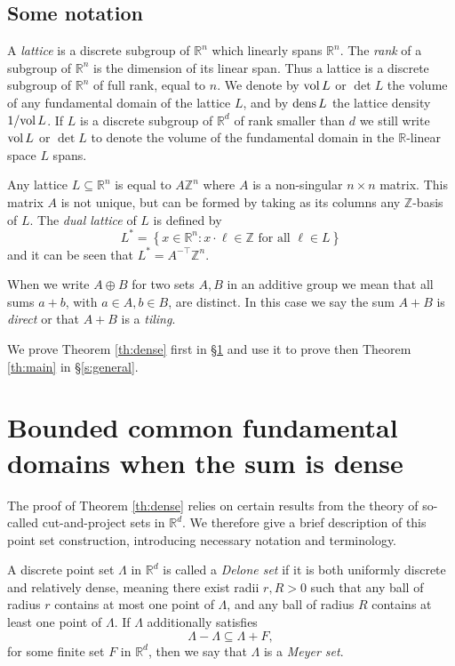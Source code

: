 \documentclass[12pt,a4paper,oneside]{amsart}
\theoremstyle{plain}
\theoremstyle{definition}
\newcommand{\Set}[1]{{\left\{{#1}\right\}}}
\newcommand{\RR}{{\mathbb R}}
\newcommand{\ZZ}{{\mathbb Z}}
\newcommand{\dens}{{\rm dens\,}}
\newcommand{\vol}{{\rm vol\,}}
\newcounter{rem}
\begin{document}
\subsection{Some notation}\label{ss:notation}

A \textit{lattice} is a discrete subgroup of $\RR^n$ which linearly spans $\RR^n$. The \textit{rank} of a subgroup of $\RR^n$ is the dimension of its linear span. Thus a lattice is a discrete subgroup of $\RR^n$ of full rank, equal to $n$. We denote by $\vol L$ or $\det L$ the volume of any fundamental domain of the lattice $L$, and by $\dens L$ the lattice density $1/\vol L$. If $L$ is a discrete subgroup of $\RR^d$ of rank smaller than $d$ we still write $\vol L$ or $\det L$ to denote the volume of the fundamental domain in the $\RR$-linear space $L$ spans.

Any lattice $L \subseteq \RR^n$ is equal to $A\ZZ^n$ where $A$ is a non-singular $n\times n$ matrix. This matrix $A$ is not unique, but can be formed by taking as its columns any $\ZZ$-basis of $L$.
The \textit{dual lattice} of $L$ is defined by
$$
L^* = \Set{x\in\RR^n: x\cdot \ell \in \ZZ \text{ for all } \ell \in L}
$$
and it can be seen that $L^* = A^{-\top}\ZZ^n$.

When we write $A \oplus B$ for two sets $A, B$ in an additive group we mean that all sums $a+b$, with $a \in A, b \in B$, are distinct. In this case we say the sum $A+B$ is \textit{direct} or that $A+B$ is a \textit{tiling}.

 We prove Theorem \ref{th:dense} first in \S \ref{s:dense-sum} and use it to prove then Theorem \ref{th:main} in \S \ref{s:general}.







\section{Bounded common fundamental domains when the sum is dense}\label{s:dense-sum}

The proof of Theorem \ref{th:dense} relies on certain results from the theory of so-called cut-and-project sets in $\RR^d$. We therefore give a brief description of this point set construction, introducing necessary notation and terminology.

A discrete point set $\Lambda$ in $\RR^d$ is called a \emph{Delone set} if it is both uniformly discrete and relatively dense, meaning there exist radii $r,R>0$ such that any ball of radius $r$ contains at most one point of $\Lambda$, and any ball of radius $R$ contains at least one point of $\Lambda$. If $\Lambda$ additionally satisfies
\begin{equation*}
    \Lambda - \Lambda \subseteq \Lambda + F,
\end{equation*}
for some finite set $F$ in $\RR^d$, then we say that $\Lambda$ is a \emph{Meyer set}.
\end{document}
